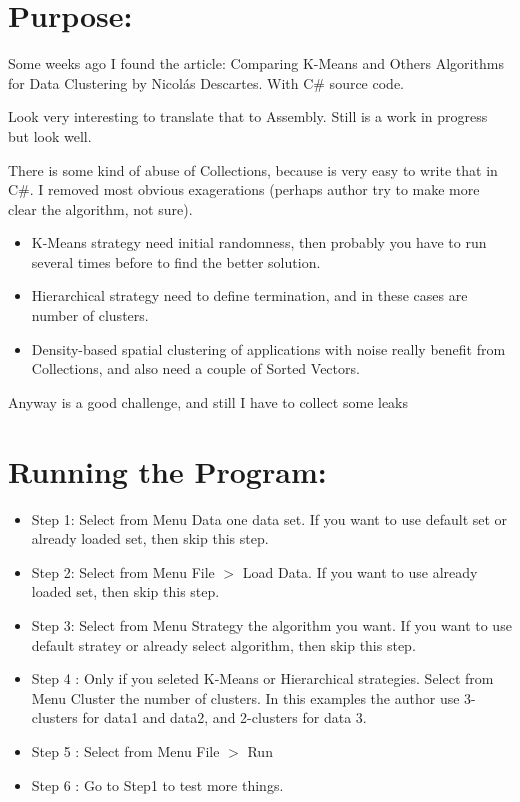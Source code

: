 \documentclass[12pt,a4paper]{scrartcl}
\begin{document}
\title{\color{myblue}{Comparing K-Means and Other Algorithms for Data Clustering\break in Assembly. }}

\author{Héctor S. Enrique}
\date{ march 17, 2026}
\maketitle

\section{Purpose:}

	Some weeks ago I found the article: Comparing K-Means and Others Algorithms for Data Clustering by Nicolás Descartes. With C\# source code.

Look very interesting to translate that to Assembly. Still is a work in progress but look well.

There is some kind of abuse of Collections, because is very easy to write that in C\#. I removed most obvious exagerations (perhaps author try to make more clear the algorithm, not sure).

 \begin{itemize}
	 \item K-Means strategy need initial randomness, then probably you have to run several times before to find the better solution.
	 \item Hierarchical strategy need to define termination, and in these cases are number of clusters.
	 \item Density-based spatial clustering of applications with noise really benefit from Collections, and also need a couple of Sorted Vectors.
 \end{itemize}

Anyway is a good challenge, and still I have to collect some leaks

\section{Running the Program: }

    \begin{itemize}
        \item Step 1: Select from Menu Data one data set. If you want to use default set or already loaded set, then skip this step. 
        \item Step 2: Select from Menu File  $\displaystyle >$
 Load Data. If you want to use already loaded set, then skip this step. 
        \item Step 3:  Select from Menu Strategy the algorithm you want. If you want to use default stratey or already select algorithm, then skip this step. 
        \item Step 4 : Only if you seleted K-Means or Hierarchical strategies. Select from  Menu Cluster the number of clusters. In this examples the author use 3-clusters for data1 and data2, and  2-clusters for data 3. 
        \item Step 5 : Select from Menu File $\displaystyle >$ Run 
        \item Step 6 : Go to Step1 to test more things. 
     \end{itemize}
\end{document}
